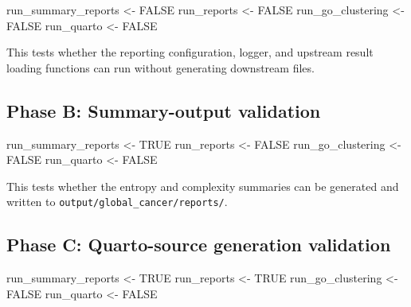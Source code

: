 \documentclass[
  letterpaper,
  DIV=11,
  numbers=noendperiod,
  openany,
  oneside]{scrreprt}
\newenvironment{Shaded}{\begin{snugshade}}{\end{snugshade}}
\newcommand{\ConstantTok}[1]{\textcolor[rgb]{0.56,0.35,0.01}{#1}}
\newcommand{\NormalTok}[1]{\textcolor[rgb]{0.00,0.23,0.31}{#1}}
\newcommand{\OtherTok}[1]{\textcolor[rgb]{0.00,0.23,0.31}{#1}}
\begin{document}
\begin{Shaded}
\begin{Highlighting}[]
\NormalTok{run\_summary\_reports }\OtherTok{\textless{}{-}} \ConstantTok{FALSE}
\NormalTok{run\_reports         }\OtherTok{\textless{}{-}} \ConstantTok{FALSE}
\NormalTok{run\_go\_clustering   }\OtherTok{\textless{}{-}} \ConstantTok{FALSE}
\NormalTok{run\_quarto          }\OtherTok{\textless{}{-}} \ConstantTok{FALSE}
\end{Highlighting}
\end{Shaded}

This tests whether the reporting configuration, logger, and upstream
result loading functions can run without generating downstream files.

\subsection*{Phase B: Summary-output
validation}\label{phase-b-summary-output-validation}

\begin{Shaded}
\begin{Highlighting}[]
\NormalTok{run\_summary\_reports }\OtherTok{\textless{}{-}} \ConstantTok{TRUE}
\NormalTok{run\_reports         }\OtherTok{\textless{}{-}} \ConstantTok{FALSE}
\NormalTok{run\_go\_clustering   }\OtherTok{\textless{}{-}} \ConstantTok{FALSE}
\NormalTok{run\_quarto          }\OtherTok{\textless{}{-}} \ConstantTok{FALSE}
\end{Highlighting}
\end{Shaded}

This tests whether the entropy and complexity summaries can be generated
and written to \texttt{output/global\_cancer/reports/}.

\subsection*{Phase C: Quarto-source generation
validation}\label{phase-c-quarto-source-generation-validation}

\begin{Shaded}
\begin{Highlighting}[]
\NormalTok{run\_summary\_reports }\OtherTok{\textless{}{-}} \ConstantTok{TRUE}
\NormalTok{run\_reports         }\OtherTok{\textless{}{-}} \ConstantTok{TRUE}
\NormalTok{run\_go\_clustering   }\OtherTok{\textless{}{-}} \ConstantTok{FALSE}
\NormalTok{run\_quarto          }\OtherTok{\textless{}{-}} \ConstantTok{FALSE}
\end{Highlighting}
\end{Shaded}
\end{document}
